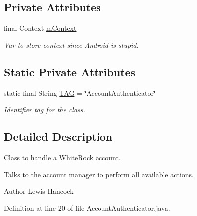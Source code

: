 \subsection*{Private Attributes}
\begin{DoxyCompactItemize}
\item 
final Context \hyperlink{classuk_1_1ac_1_1swan_1_1digitaltrails_1_1accounts_1_1_account_authenticator_a468f731a73e2164afe2f81cc06240ad9}{m\+Context}
\begin{DoxyCompactList}\small\item\em Var to store context since Android is stupid. \end{DoxyCompactList}\end{DoxyCompactItemize}
\subsection*{Static Private Attributes}
\begin{DoxyCompactItemize}
\item 
static final String \hyperlink{classuk_1_1ac_1_1swan_1_1digitaltrails_1_1accounts_1_1_account_authenticator_a39113e1c1faaa9b9629e1c07f56e1a83}{T\+A\+G} = \char`\"{}Account\+Authenticator\char`\"{}
\begin{DoxyCompactList}\small\item\em Identifier tag for the class. \end{DoxyCompactList}\end{DoxyCompactItemize}


\subsection{Detailed Description}
Class to handle a White\+Rock account. 

Talks to the account manager to perform all available actions. \begin{DoxyAuthor}{Author}
Lewis Hancock 
\end{DoxyAuthor}


Definition at line 20 of file Account\+Authenticator.\+java.



